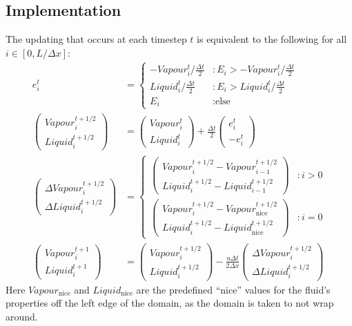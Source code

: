 \documentclass[11pt]{article}
\begin{document}
\subsection{Implementation}
The updating that occurs at each timestep $t$ is equivalent to the following for all $i\in\left[0,L/\Delta x\right]$:
\begin{align*}
	e^t_i &= \begin{cases}
		-Vapour^t_i / \frac{\Delta t}{2}		& : E_i > -Vapour^t_i / \frac{\Delta t}{2} \\
		Liquid^t_i / \frac{\Delta t}{2}		& : E_i > Liquid^t_i / \frac{\Delta t}{2} \\
		E_i & : \text{else}
	\end{cases} \\
	\begin{pmatrix}Vapour^{t+1/2}_i\\Liquid^{t+1/2}_i\end{pmatrix} &=
		\begin{pmatrix}Vapour^t_i\\Liquid^t_i\end{pmatrix}
		+ \frac{\Delta t}{2}\begin{pmatrix}e^t_i\\-e^t_i\end{pmatrix} \\
	\begin{pmatrix}\Delta Vapour^{t+1/2}_i\\\Delta Liquid^{t+1/2}_i\end{pmatrix} &= \begin{cases}
		\begin{pmatrix}Vapour^{t+1/2}_i - Vapour^{t+1/2}_{i-1}\\Liquid^{t+1/2}_i - Liquid^{t+1/2}_{i-1}\end{pmatrix}			& : i > 0 \\
		\begin{pmatrix}Vapour^{t+1/2}_i - Vapour^{t+1/2}_{\text{nice}}\\Liquid^{t+1/2}_i - Liquid^{t+1/2}_{\text{nice}}\end{pmatrix}	& : i = 0
	\end{cases} \\
	\begin{pmatrix}Vapour^{t+1}_i\\Liquid^{t+1}_i\end{pmatrix} &=
		\begin{pmatrix}Vapour^{t+1/2}_i\\Liquid^{t+1/2}_i\end{pmatrix}
		- \frac{u\Delta t}{2\Delta x}\begin{pmatrix}\Delta Vapour^{t+1/2}_i\\\Delta Liquid^{t+1/2}_i\end{pmatrix}
\end{align*}
Here $Vapour_{\text{nice}}$ and $Liquid_{\text{nice}}$ are the predefined ``nice'' values for the fluid's properties off the left edge of the domain, as the domain is taken to not wrap around.
\end{document}
